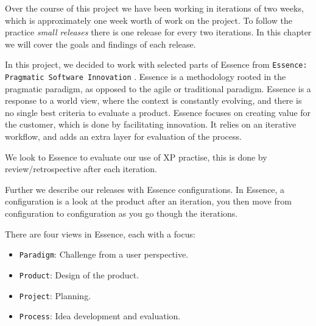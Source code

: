 Over the course of this project we have been working in iterations of two weeks, which is approximately one week worth of work on the project. To follow the practice \textit{small releases} there is one release for every two iterations. In this chapter we will cover the goals and findings of each release.

In this project, we decided to work with selected parts of Essence from \texttt{Essence: Pragmatic Software Innovation} \citep{essence:config}. Essence is a methodology rooted in the pragmatic paradigm, as opposed to the agile or traditional paradigm. Essence is a response to a world view, where the context is constantly evolving, and there is no single best criteria to evaluate a product. Essence focuses on creating value for the customer, which is done by facilitating innovation. It relies on an iterative workflow, and adds an extra layer for evaluation of the process.

We look to Essence to evaluate our use of XP practise, this is done by review/retrospective after each iteration.

Further we describe our releases with Essence configurations. In Essence, a configuration is a look at the product after an iteration, you then move from configuration to configuration as you go though the iterations. 

There are four views in Essence, each with a focus: 
\begin{itemize}
\item \texttt{Paradigm}: Challenge from a user perspective.
\item \texttt{Product}: Design of the product.
\item \texttt{Project}: Planning.
\item \texttt{Process}: Idea development and evaluation.
\end{itemize}



